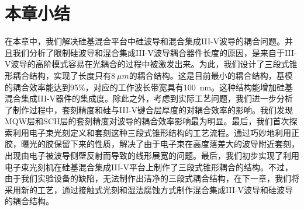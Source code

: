 \section{本章小结}
在本章中，我们解决硅基混合平台中硅波导和混合集成III-V波导的耦合问题。并且我们分析了限制硅波导和混合集成III-V波导耦合器件长度的原因，是来自于III-V波导的高阶模式容易在光耦合的过程中被激发出来。为此，我们设计了三段式锥形耦合结构，实现了长度只有$8 ~\mu m$的耦合结构。这是目前最小的耦合结构，基模的耦合效率能达到95\%，对应的工作波长带宽具有100~nm。这种结构能增加硅基混合集成III-V器件的集成度。除此之外，考虑到实际工艺问题，我们进一步分析了制作过程中，套刻精度和硅与III-V键合层厚度的对耦合效率的影响。我们发现MQW层和SCH层的套刻精度对波导的耦合效率影响最为明显。最后，我们首次探索利用电子束光刻定义和套刻这种三段式锥形结构的工艺流程。通过巧妙地利用正胶，曝光的胶保留下来的性质，解决了由于电子束在高度落差大的波导附近套刻，出现由电子被波导侧壁反射而导致的线形展宽的问题。最后，我们初步实现了利用电子束光刻机在硅基混合集成III-V平台上制作了三段式锥形耦合的结构。不过，由于我们实验设备的缺陷，无法制作出洁净的三段式耦合结构，在下一章，我们将采用新的工艺，通过接触式光刻和湿法腐蚀方式制作混合集成III-V波导和硅波导的耦合结构。